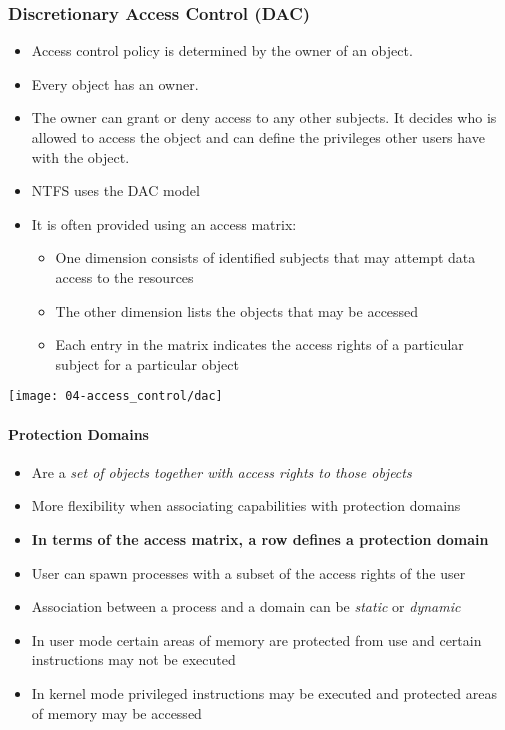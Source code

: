 \subsubsection{Discretionary Access Control (DAC)}
\begin{itemize}
    \item Access control policy is determined by the owner of an object.
    \item Every object has an owner.
    \item The owner can grant or deny access to any other subjects. It decides who is allowed to access the object and can define the privileges other users have with the object.
    \item NTFS uses the DAC model
    \item It is often provided using an access matrix:
    \begin{itemize}
        \item One dimension consists of identified subjects that may attempt data access to the resources
        \item The other dimension lists the objects that may be accessed
        \item Each entry in the matrix indicates the access rights of a particular subject for a particular object
    \end{itemize}
\end{itemize}

\begin{center}
    \texttt{[image: 04-access\_control/dac]}
    \vspace{-8pt}
\end{center}

\paragraph{Protection Domains}
\begin{itemize}
    \item Are a \textit{set of objects together with access rights to those objects}
    \item More flexibility when associating capabilities with protection domains
    \item \textbf{In terms of the access matrix, a row defines a protection domain}
    \item User can spawn processes with a subset of the access rights of the user
    \item Association between a process and a domain can be \textit{static} or \textit{dynamic}
    \item In user mode certain areas of memory are protected from use and certain instructions may not be executed
    \item In kernel mode privileged instructions may be executed and protected areas of memory may be accessed
\end{itemize}

